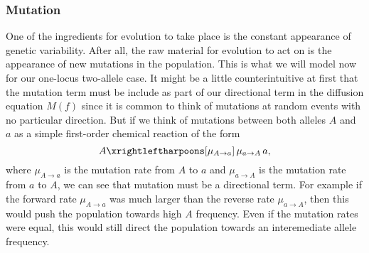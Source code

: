 \subsubsection{Mutation}

One of the ingredients for evolution to take place is the constant appearance
of genetic variability. After all, the raw material for evolution to act on is
the appearance of new mutations in the population. This is what we will model
now for our one-locus two-allele case. It might be a little counterintuitive at
first that the mutation term must be include as part of our directional term in
the diffusion equation $M(f)$ since it is common to think of mutations at
random events with no particular direction. But if we think of mutations
between both alleles $A$ and $a$ as a simple first-order chemical reaction of
the form
\begin{equation}
  A \xrightleftharpoons[\mu_{A\rightarrow a}]
  {\,\mu_{a\rightarrow A}\,} a,
\end{equation}
where $\mu_{A\rightarrow a}$ is the mutation rate from $A$ to $a$ and 
$\mu_{a\rightarrow A}$ is the mutation rate from $a$ to $A$, we can see that 
mutation must be a directional term. For example if the forward rate 
$\mu_{A\rightarrow a}$ was much larger than the reverse rate 
$\mu_{a\rightarrow A}$, then this would push the population towards high $A$
frequency. Even if the mutation rates were equal, this would still direct the
population towards an interemediate allele frequency.